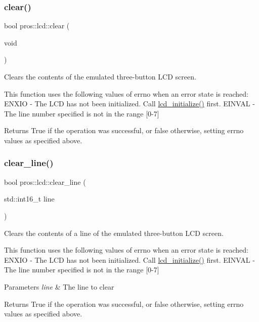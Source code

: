 \subsubsection{\texorpdfstring{clear()}{clear()}}
{\footnotesize\ttfamily bool pros\+::lcd\+::clear (\begin{DoxyParamCaption}\item[{void}]{ }\end{DoxyParamCaption})}



Clears the contents of the emulated three-\/button L\+CD screen. 

This function uses the following values of errno when an error state is reached\+: E\+N\+X\+IO -\/ The L\+CD has not been initialized. Call \hyperlink{llemu_8h_ae618494f080e95b506c0c18cb1ffb407}{lcd\+\_\+initialize()} first. E\+I\+N\+V\+AL -\/ The line number specified is not in the range \mbox{[}0-\/7\mbox{]}

\begin{DoxyReturn}{Returns}
True if the operation was successful, or false otherwise, setting errno values as specified above. 
\end{DoxyReturn}
\mbox{\label{namespacepros_1_1lcd_aef44947cea9006f86d4aaa2e32856835}} 
\subsubsection{\texorpdfstring{clear\+\_\+line()}{clear\_line()}}
{\footnotesize\ttfamily bool pros\+::lcd\+::clear\+\_\+line (\begin{DoxyParamCaption}\item[{std\+::int16\+\_\+t}]{line }\end{DoxyParamCaption})}



Clears the contents of a line of the emulated three-\/button L\+CD screen. 

This function uses the following values of errno when an error state is reached\+: E\+N\+X\+IO -\/ The L\+CD has not been initialized. Call \hyperlink{llemu_8h_ae618494f080e95b506c0c18cb1ffb407}{lcd\+\_\+initialize()} first. E\+I\+N\+V\+AL -\/ The line number specified is not in the range \mbox{[}0-\/7\mbox{]}


\begin{DoxyParams}{Parameters}
{\em line} & The line to clear\\
\hline
\end{DoxyParams}
\begin{DoxyReturn}{Returns}
True if the operation was successful, or false otherwise, setting errno values as specified above. 
\end{DoxyReturn}
\mbox{\label{namespacepros_1_1lcd_a4d8f5121ac67ae7de816334e7b66f08d}} 
